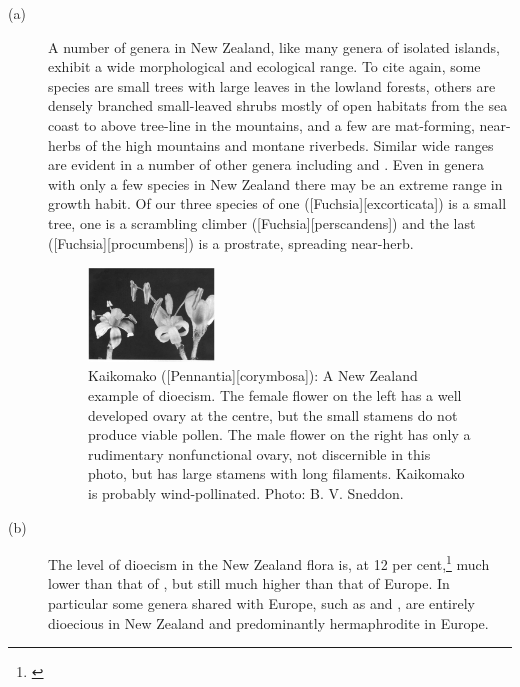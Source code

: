 \begin{description}
\item[{(a)}]A number of genera in New Zealand, like many genera of isolated islands, exhibit a wide morphological and ecological range.
To cite  again, some species are small trees with large leaves in the lowland forests, others are densely branched small-leaved shrubs mostly of open habitats from the sea coast to above tree-line in the mountains, and a few are mat-forming, near-herbs of the high mountains and montane riverbeds.
Similar wide ranges are evident in a number of other genera including  and .
Even in genera with only a few species in New Zealand there may be an extreme range in growth habit.
Of our three species of  one ([Fuchsia][excorticata]) is a small tree, one is a scrambling climber ([Fuchsia][perscandens]) and the last ([Fuchsia][procumbens]) is a prostrate, spreading near-herb.
\begin{figure}
	\includegraphics[width=0.33\textwidth]{graphics/figure4kaikomako.jpg}
	\centering
	\caption[Kaikomako: A New Zealand example of dioecism]{Kaikomako ([Pennantia][corymbosa]): A New Zealand example of dioecism.
	The female flower on the left has a well developed ovary at the centre, but the small stamens do not produce viable pollen.
	The male flower on the right has only a rudimentary nonfunctional ovary, not discernible in this photo, but has large stamens with long filaments.
	Kaikomako is probably wind-pollinated.
	Photo: B. V. Sneddon.}%
	\label{fig:4kaikomako}
\end{figure}
\item[{(b)}]The level of dioecism in the New Zealand flora is, at 12 per cent,\footnote{\cite{godley1979flower}} much lower than that of , but still much higher than that of Europe.
In particular some genera shared with Europe, such as  and , are entirely dioecious in New Zealand and predominantly hermaphrodite in Europe.

\end{description}
